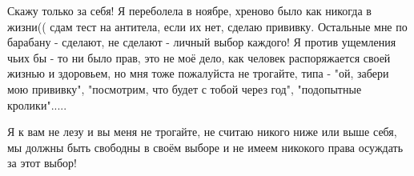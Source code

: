 \begin{itemize}
 

Скажу только за себя! Я переболела в ноябре, хреново было как никогда в жизни((
сдам тест на антитела, если их нет, сделаю прививку. Остальные мне по барабану
- сделают, не сделают - личный выбор каждого! Я против ущемления чьих бы - то
ни было прав, это не моё дело, как человек распоряжается своей жизнью и
здоровьем, но мня тоже пожалуйста не трогайте, типа - "ой, забери мою
прививку", "посмотрим, что будет с тобой через год", "подопытные кролики".....

Я к вам не лезу и вы меня не трогайте, не считаю никого ниже или выше себя, мы
должны быть свободны в своём выборе и не имеем никокого права осуждать за этот
выбор!
\end{itemize}

